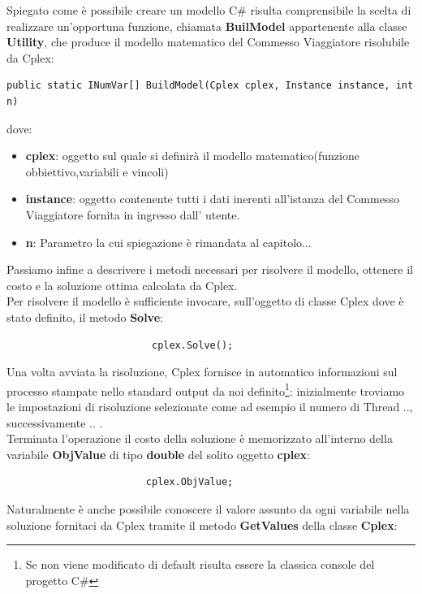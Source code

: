 \documentclass[11pt]{article}
\begin{document}
Spiegato come è possibile creare un modello C\# risulta comprensibile la scelta di realizzare un'opportuna funzione, chiamata \textbf{BuilModel} appartenente alla classe \textbf{Utility}, che produce il modello matematico del Commesso Viaggiatore risolubile da Cplex:

\begin{lstlisting}
public static INumVar[] BuildModel(Cplex cplex, Instance instance, int n)
\end{lstlisting}

dove:

\begin{itemize}
\item \textbf{cplex}: oggetto sul quale si definirà il modello matematico(funzione obbiettivo,variabili e vincoli)
\item \textbf{instance}: oggetto contenente tutti i dati inerenti all'istanza del Commesso Viaggiatore fornita in ingresso dall' utente.
\item \textbf{n}: Parametro la cui spiegazione è rimandata al capitolo...
\end{itemize}

Passiamo infine a descrivere i metodi necessari per risolvere il modello, ottenere il costo e la soluzione ottima calcolata da Cplex.\\

Per risolvere il modello è sufficiente invocare, sull'oggetto di classe Cplex dove è stato definito, il metodo \textbf{Solve}:

\begin{lstlisting}
                         cplex.Solve();
\end{lstlisting}

Una volta avviata la risoluzione, Cplex fornisce in automatico informazioni sul processo stampate nello standard output da noi definito\footnote{Se non viene modificato di default risulta essere la classica console del progetto C\#}: inizialmente troviamo le impostazioni di risoluzione selezionate come ad esempio il numero di Thread .., successivamente ..  .\\
Terminata l'operazione il costo della soluzione è memorizzato all'interno della variabile \textbf{ObjValue} di tipo \textbf{double} del solito oggetto \textbf{cplex}:

\begin{lstlisting}
                        cplex.ObjValue; 
\end{lstlisting}

Naturalmente è anche possibile conoscere il valore assunto da ogni variabile nella soluzione fornitaci da Cplex tramite il metodo \textbf{GetValues} della classe \textbf{Cplex}:
\end{document}
